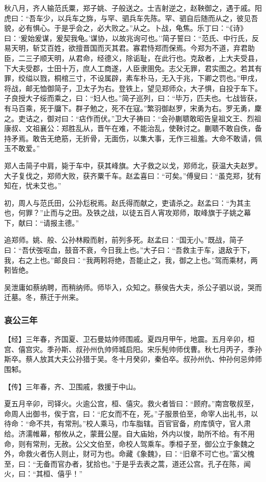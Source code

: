 \documentclass[]{article}
\begin{document}
秋八月，齐人输范氏粟，郑子姚、子般送之。士吉射逆之，赵鞅御之，遇于戚。阳虎曰：``吾车少，以兵车之旆，与罕、驷兵车先陈。罕、驷自后随而从之，彼见吾貌，必有惧心。于是乎会之，必大败之。''从之。卜战，龟焦。乐丁曰：``《诗》曰：`爰始爰谋，爰契我龟。'谋协，以故兆询可也。''简子誓曰：``范氏、中行氏，反易天明，斩艾百姓，欲擅晋国而灭其君。寡君恃郑而保焉。今郑为不道，弃君助臣，二三子顺天明，从君命，经德义，除诟耻，在此行也。克敌者，上大夫受县，下大夫受郡，士田十万，庶人工商遂，人臣隶圉免。志父无罪，君实图之。若其有罪，绞缢以戮，桐棺三寸，不设属辟，素车朴马，无入于兆，下卿之罚也。''甲戌，将战，邮无恤御简子，卫太子为右。登铁上，望见郑师众，大子惧，自投于车下。子良授大子绥而乘之，曰：``妇人也。''简子巡列，曰：``毕万，匹夫也。七战皆获，有马百乘，死于牖下。群子勉之，死不在寇。''繁羽御赵罗，宋勇为右。罗无勇，麇之。吏诘之，御对曰：``痁作而伏。''卫大子祷曰：``会孙蒯聩敢昭告皇祖文王、烈祖康叔、文祖襄公：郑胜乱从，晋午在难，不能治乱，使鞅讨之。蒯聩不敢自佚，备持矛焉。敢告无绝筋，无折骨，无面伤，以集大事，无作三祖羞。大命不敢请，佩玉不敢爱。''

郑人击简子中肩，毙于车中，获其峰旗。大子救之以戈，郑师北，获温大夫赵罗。大子复伐之，郑师大败，获齐粟千车。赵孟喜曰：``可矣。''傅叟曰：``虽克郑，犹有知在，忧未艾也。''

初，周人与范氏田，公孙尨税焉。赵氏得而献之，吏请杀之。赵孟曰：``为其主也，何罪？''止而与之田。及铁之战，以徒五百人宵攻郑师，取峰旗于子姚之幕下，献曰：``请报主德。''

追郑师。姚、般、公孙林殿而射，前列多死。赵孟曰：``国无小。''既战，简子曰：``吾伏弢呕血，鼓音不衰，今日我上也。''大子曰：``吾救主于车，退敌于下，我，右之上也。''邮良曰：``我两靷将绝，吾能止之，我，御之上也。''驾而乘材，两靷皆绝。

吴泄庸如蔡纳聘，而稍纳师。师毕入，众知之。蔡侯告大夫，杀公子驷以说，哭而迁墓。冬，蔡迁于州来。

\hypertarget{header-n3069}{%
\subsubsection{哀公三年}\label{header-n3069}}

【经】三年春，齐国夏、卫石曼姑帅师围戚。夏四月甲午，地震。五月辛卯，桓宫、僖宫灾。季孙斯、叔孙州仇帅师城启阳。宋乐髡帅师伐曹。秋七月丙子，季孙斯卒。蔡人放其大夫公孙猎于吴。冬十月癸卯，秦伯卒。叔孙州仇、仲孙何忌帅师围邾。

【传】三年春，齐、卫围戚，救援于中山。

夏五月辛卯，司铎火。火逾公宫，桓、僖灾。救火者皆曰：``顾府。''南宫敬叔至，命周人出御书，俟于宫，曰：``庀女而不在，死。''子服景伯至，命宰人出礼书，以待命：``命不共，有常刑。''校人乘马，巾车脂辖。百官官备，府库慎守，官人肃给。济濡帷幕，郁攸从之，蒙葺公屋。自大庙始，外内以悛，助所不给。有不用命，则有常刑，无赦。公父文伯至，命校人驾乘车。季桓子至，御公立于象魏之外，命救火者伤人则止，财可为也。命藏《象魏》，曰：``旧章不可亡也。''富父槐至，曰：``无备而官办者，犹拾也。''于是乎去表之蒿，道还公宫。孔子在陈，闻火，曰：``其桓、僖乎！''
\end{document}
